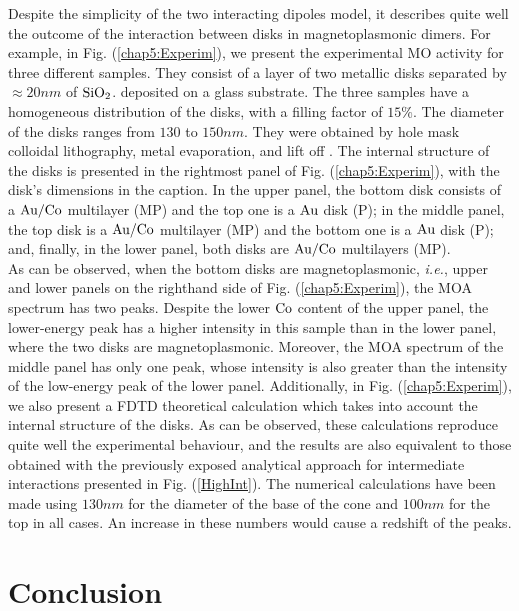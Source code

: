 Despite the simplicity of the two interacting dipoles model, it describes quite well the outcome of the interaction between disks in magnetoplasmonic dimers. For example, in Fig. (\ref{chap5:Experim}), we present the experimental MO activity for three different samples. They consist of a layer of two metallic disks separated by $\approx 20 nm$ of $\textnormal{SiO}_2$.  deposited on a glass substrate. The three samples have a homogeneous distribution of the disks, with a filling factor of $15\%$. The diameter of the disks ranges from $130$ to $150nm$. They were obtained by hole mask colloidal lithography, metal evaporation, and lift off \cite{fredriksson2007hole}. The internal structure of the disks is presented in the rightmost panel of Fig.  (\ref{chap5:Experim}), with the disk's dimensions in the caption. In the upper panel, the bottom disk consists of a $\textnormal{Au}/\textnormal{Co}$ multilayer (MP) and the top one is a $\textnormal{Au}$ disk (P); in the middle panel, the top disk is a $\textnormal{Au}/\textnormal{Co}$ multilayer (MP) and the bottom one is a $\textnormal{Au}$ disk (P); and, finally, in the lower panel, both disks are $\textnormal{Au}/\textnormal{Co}$ multilayers (MP).\\
As can be observed, when the bottom disks are magnetoplasmonic, \textit{i.e.}, upper and lower panels on the righthand side of Fig. (\ref{chap5:Experim}), the MOA spectrum has two peaks. Despite the lower $\textnormal{Co}$ content of the upper panel, the lower-energy peak has a higher intensity in this sample than in the lower panel, where the two disks are magnetoplasmonic. Moreover, the MOA spectrum of the middle panel has only one peak, whose intensity is also greater than the intensity of the low-energy peak of the lower panel. Additionally, in Fig. (\ref{chap5:Experim}), we also present a FDTD theoretical calculation which takes into account the internal structure of the disks. As can be observed, these calculations reproduce quite well the experimental behaviour, and the results are also equivalent to those obtained with the previously exposed analytical approach for intermediate interactions presented in Fig. (\ref{HighInt}). The numerical calculations have been made using $130nm$ for the diameter of the base of the cone and $100nm$ for the top in all cases. An increase in these numbers would cause a redshift of the peaks.

\section{Conclusion}

